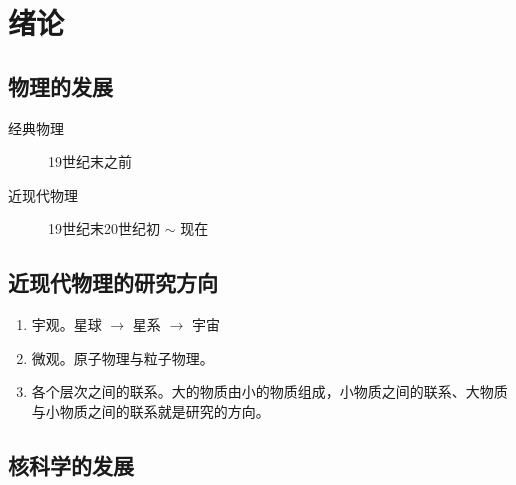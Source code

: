 \chapter{绪论}

\section{物理的发展}

\begin{description}
    \item[经典物理] 19世纪末之前
    \item[近现代物理] 19世纪末20世纪初 $\sim $ 现在  
\end{description}

\section{近现代物理的研究方向}

\begin{enumerate}
    \item 宇观。星球 $\rightarrow$ 星系 $\rightarrow$ 宇宙
    \item 微观。原子物理与粒子物理。
    \item 各个层次之间的联系。大的物质由小的物质组成，小物质之间的联系、大物质与小物质之间的联系就是研究的方向。
\end{enumerate}

\section{核科学的发展}

